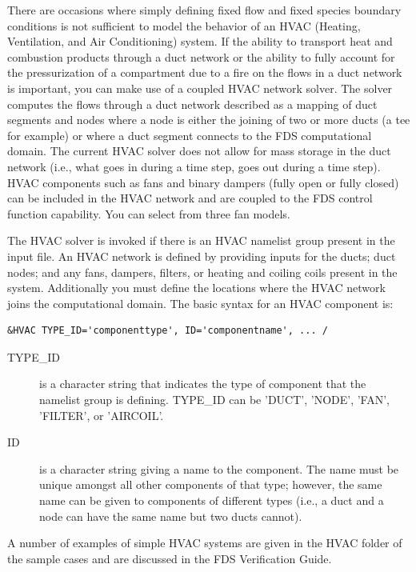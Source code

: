 \documentclass[11pt]{book}
\begin{document}
There are occasions where simply defining fixed flow and fixed species boundary conditions is not sufficient to model the behavior of an HVAC (Heating, Ventilation, and Air Conditioning) system.
If the ability to transport heat and combustion products through a duct network or the ability to fully account for the pressurization of a compartment
due to a fire on the flows in a duct network is important, you can make use of a coupled HVAC network solver.  The solver computes the flows through a
duct network described as a mapping of duct segments and nodes where a node is either the joining of two or more ducts (a tee for example) or where a duct segment connects to the FDS computational domain.
The current HVAC solver does not allow for mass storage in the duct network (i.e., what goes in during a time step, goes out during a time step).
HVAC components such as fans and binary dampers (fully open or fully closed) can be included in the HVAC network and are coupled to the FDS control function capability.  You can select from three fan models.

The HVAC solver is invoked if there is an {\ct HVAC} namelist group present in the input file.
An HVAC network is defined by providing inputs for the ducts; duct nodes; and any fans, dampers, filters, or heating and coiling coils present in the system.
Additionally you must define the locations where the HVAC network joins the computational domain.  The basic syntax for an {\ct HVAC} component is:

\begin{lstlisting}
&HVAC TYPE_ID='componenttype', ID='componentname', ... /
\end{lstlisting}


\begin{description}
\item[{\ct TYPE\_ID}] is a character string that indicates the type of component that the namelist group is defining.   {\ct TYPE\_ID} can be {\ct 'DUCT'}, {\ct 'NODE'}, {\ct 'FAN'}, {\ct 'FILTER'}, or {\ct 'AIRCOIL'}.
\item[{\ct ID}] is a character string giving a name to the component.  The name must be unique amongst all other components of that type; however, the same name can be given to components of different types (i.e., a duct and a node can have the same name but two ducts cannot).
\end{description}
A number of examples of simple HVAC systems are given in the HVAC folder of the sample cases and are discussed in the FDS Verification Guide.
\end{document}
